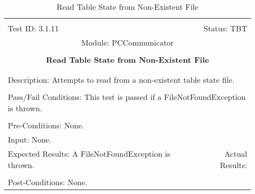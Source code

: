 \documentclass[titlepage]{article}
\begin{document}
\begin{center}%
\begin{table}[h!]
\begin{tabular}{|l r|}\hline&\\[-2mm]
	Test ID: 3.1.11	&Status: TBT\\[-3mm]
	\multicolumn{2}{|c|}{Module: PCCommunicator}\\&\\
	\multicolumn{2}{|c|}{\textbf{\large{Read Table State from Non-Existent File}}}\\&\\\hline&\\[-3mm]
	\multicolumn{2}{|p{\textwidth}|}{Description: Attempts to read from a non-existent table state file.}\\[1mm]\hline&\\[-3mm]
	\multicolumn{2}{|p{\textwidth}|}{Pass/Fail Conditions: This test is passed if a FileNotFoundException is thrown.}\\[1mm]\hline&\\[-3mm]
	\multicolumn{2}{|p{\textwidth}|}{Pre-Conditions: None.}\\[4mm]
	\multicolumn{2}{|p{\textwidth}|}{Input: None.}\\[2mm]\hline
	\multicolumn{1}{|p{0.49\textwidth}}{Expected Results: A FileNotFoundException is thrown.}	&\multicolumn{1}{|p{0.45\textwidth}|}{Actual Results: }\\\hline&\\[-3mm]
	\multicolumn{2}{|p{\textwidth}|}{Post-Conditions: None.}\\\hline
\end{tabular}
\caption{Read Table State from Non-Existent File}
\end{table}
\end{center}
\newpage
\end{document}
